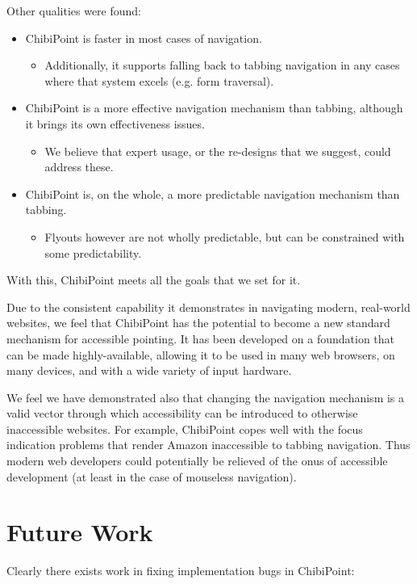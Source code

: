 \documentclass[11pt,openright,a4paper]{report}
\begin{document}
Other qualities were found:

\begin{itemize}
\item ChibiPoint is faster in most cases of navigation.
	\begin{itemize}
	\item Additionally, it supports falling back to tabbing navigation in any cases where that system excels (e.g. form traversal).
	\end{itemize}
\item ChibiPoint is a more effective navigation mechanism than tabbing, although it brings its own effectiveness issues.
	\begin{itemize}
	\item We believe that expert usage, or the re-designs that we suggest, could address these.
	\end{itemize}
\item ChibiPoint is, on the whole, a more predictable navigation mechanism than tabbing.
	\begin{itemize}
	\item Flyouts however are not wholly predictable, but can be constrained with some predictability.
	\end{itemize}
\end{itemize}

With this, ChibiPoint meets all the goals that we set for it.

Due to the consistent capability it demonstrates in navigating modern, real-world websites, we feel that ChibiPoint has the potential to become a new standard mechanism for accessible pointing. It has been developed on a foundation that can be made highly-available, allowing it to be used in many web browsers, on many devices, and with a wide variety of input hardware.

We feel we have demonstrated also that changing the navigation mechanism is a valid vector through which accessibility can be introduced to otherwise inaccessible websites. For example, ChibiPoint copes well with the focus indication problems that render Amazon inaccessible to tabbing navigation. Thus modern web developers could potentially be relieved of the onus of accessible development (at least in the case of mouseless navigation).

\section{Future Work}
Clearly there exists work in fixing implementation bugs in ChibiPoint:
\end{document}
